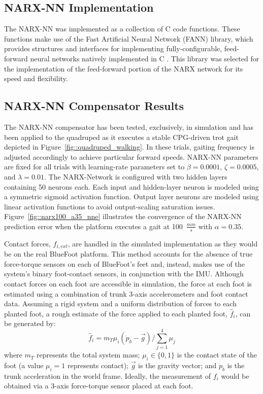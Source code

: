 		\subsection{NARX-NN Implementation}

			The NARX-NN was implemented as a collection of C code functions. These functions make use of the Fast Artificial Neural Network (FANN) library, which provides structures and interfaces for implementing fully-configurable, feed-forward neural networks natively implemented in C \cite{Nissen03}. This library was selected for the implementation of the feed-forward portion of the NARX network for its speed and flexibility. 


		\subsection{NARX-NN Compensator Results}

			The NARX-NN compensator has been tested, exclusively, in simulation and has been applied to the quadruped as it executes a stable CPG-driven trot gait depicted in Figure~\ref{fig::quadruped_walking}. In these trials, gaiting frequency is adjusted accordingly to achieve particular forward speeds. NARX-NN parameters are fixed for all trials with learning-rate  parameters set to $\beta=0.0001$, $\zeta=0.0005$, and $\lambda = 0.01$. The NARX-Network is configured with two hidden layers containing 50 neurons each. Each input and hidden-layer neuron is modeled using a symmetric sigmoid activation function. Output layer neurons are modeled using linear activation functions to  avoid output-scaling saturation issues. Figure~\ref{fig::narx100_a35_nne} illustrates the convergence of the NARX-NN prediction error when the platform executes a gait at  100~$\frac{mm}{s}$ with $\alpha = 0.35$.

			Contact forces, ${f}_{i,ext}$, are handled in the simulated implementation as they would be on the real BlueFoot platform. This method accounts for the absence of true force-torque sensors on each of BlueFoot's feet and, instead, makes use of the system's binary foot-contact sensors, in conjunction with the IMU. Although contact forces on each foot are accessible in simulation, the force at each foot is estimated using a combination of trunk 3-axis accelerometers and foot contact data. Assuming a rigid system and a uniform distribution of forces to each planted foot, a rough estimate of the force applied to each \Ith planted foot, $\hat{f}_{i}$, can be generated by:
				\begin{equation}
					\hat{f}_{i} = {m_{T}\mu_{i}} \left(\ddot{p}_{b} - \vec{g}\right)/{\sum_{j=1}^{4}{\mu_{j}}}
				\end{equation}
			where $m_{T}$ represents the total system mass; $\mu_{i}\in \{0,1\}$ is the contact state of the \Ith
			foot (a value $\mu_{i}=1$ represents contact); $\vec{g}$ is the gravity vector; and $\ddot{p}_{b}$ is the trunk acceleration in the world frame. Ideally, the measurement of ${f}_{i}$ would be obtained via a 3-axis force-torque sensor placed at each foot.

